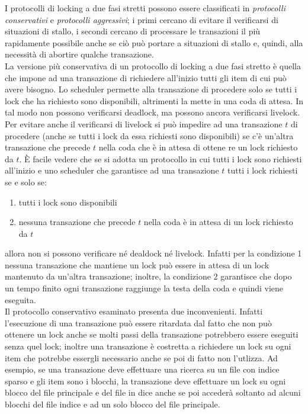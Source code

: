 I protocolli di locking a due fasi stretti possono essere classificati in \emph{protocolli conservativi} e
\emph{protocolli aggressivi}; i primi cercano di evitare il verificarsi di situazioni di stallo, i secondi cercano
di processare le transazioni il più rapidamente possibile anche se ciò può portare a situazioni di
stallo e, quindi, alla necessità di abortire qualche transazione.\\

La versione più conservativa di un protocollo di locking a due fasi stretto è quella che impone ad
una transazione di richiedere all'inizio tutti gli item di cui può avere bisogno. Lo scheduler permette
alla transazione di procedere solo se tutti i lock che ha richiesto sono disponibili, altrimenti la mette
in una coda di attesa. In tal modo non possono verificarsi deadlock, ma possono ancora verificarsi
livelock. Per evitare anche il verificarsi di livelock si può impedire ad una transazione $t$ di
procedere (anche se tutti i lock da essa richiesti sono disponibili) se c'è un'altra transazione che
precede $t$ nella coda che è in attesa di ottene re un lock richiesto da $t$. \`E facile vedere che se si
adotta un protocollo in cui tutti i lock sono richiesti all'inizio e uno scheduler che garantisce ad una
transazione $t$ tutti i lock richiesti se e solo se:
\begin{enumerate}
 \item tutti i lock sono disponibili
 \item nessuna transazione che precede $t$ nella coda è in attesa di un lock richiesto da $t$
\end{enumerate}
allora non si possono verificare né dealdock né livelock. Infatti per la condizione 1 nessuna
transazione che mantiene un lock può essere in attesa di un lock mantenuto da un'altra transazione;
inoltre, la condizione 2 garantisce che dopo un tempo finito ogni transazione raggiunge la testa della
coda e quindi viene eseguita.\\
Il protocollo conservativo esaminato presenta due inconvenienti. Infatti l'esecuzione di una
transazione può essere ritardata dal fatto che non può ottenere un lock anche se molti passi della
transazione potrebbero essere eseguiti senza quel lock; inoltre una transazione è costretta a
richiedere un lock su ogni item che potrebbe essergli necessario anche se poi di fatto non l'utlizza.
Ad esempio, se una transazione deve effettuare una ricerca su un file con indice sparso e gli item
sono i blocchi, la transazione deve effettuare un lock su ogni blocco del file principale e del file
in dice anche se poi accederà soltanto ad alcuni blocchi del file indice e ad un solo blocco del file
principale.\\

